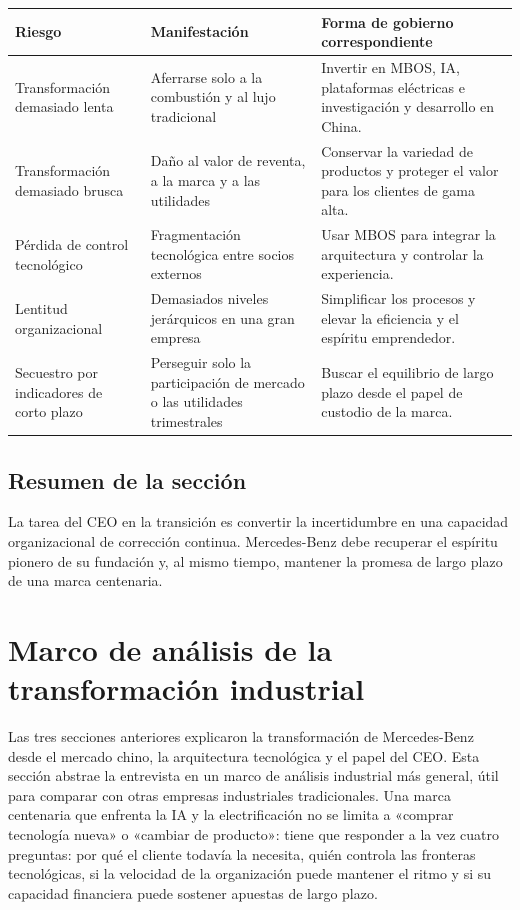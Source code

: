 \documentclass[a4paper]{article}
\begin{document}
\noindent\begin{tabularx}{\textwidth}{p{}p{}X}
\toprule
Riesgo & Manifestación & Forma de gobierno correspondiente \\
\midrule
Transformación demasiado lenta & Aferrarse solo a la combustión y al lujo tradicional & Invertir en MBOS, IA, plataformas eléctricas e investigación y desarrollo en China. \\
Transformación demasiado brusca & Daño al valor de reventa, a la marca y a las utilidades & Conservar la variedad de productos y proteger el valor para los clientes de gama alta. \\
Pérdida de control tecnológico & Fragmentación tecnológica entre socios externos & Usar MBOS para integrar la arquitectura y controlar la experiencia. \\
Lentitud organizacional & Demasiados niveles jerárquicos en una gran empresa & Simplificar los procesos y elevar la eficiencia y el espíritu emprendedor. \\
Secuestro por indicadores de corto plazo & Perseguir solo la participación de mercado o las utilidades trimestrales & Buscar el equilibrio de largo plazo desde el papel de custodio de la marca. \\
\bottomrule
\end{tabularx}

\subsection{Resumen de la sección}

La tarea del CEO en la transición es convertir la incertidumbre en una capacidad organizacional de corrección continua. Mercedes-Benz debe recuperar el espíritu pionero de su fundación y, al mismo tiempo, mantener la promesa de largo plazo de una marca centenaria.
\section{Marco de análisis de la transformación industrial}

Las tres secciones anteriores explicaron la transformación de Mercedes-Benz desde el mercado chino, la arquitectura tecnológica y el papel del CEO. Esta sección abstrae la entrevista en un marco de análisis industrial más general, útil para comparar con otras empresas industriales tradicionales. Una marca centenaria que enfrenta la IA y la electrificación no se limita a «comprar tecnología nueva» o «cambiar de producto»: tiene que responder a la vez cuatro preguntas: por qué el cliente todavía la necesita, quién controla las fronteras tecnológicas, si la velocidad de la organización puede mantener el ritmo y si su capacidad financiera puede sostener apuestas de largo plazo.
\end{document}
